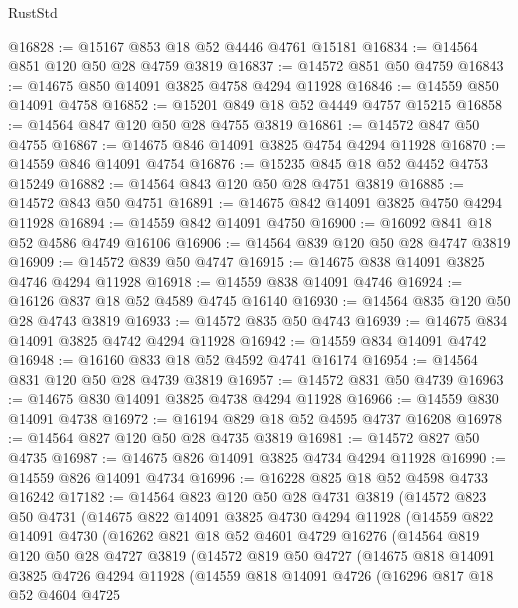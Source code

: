 \begin{lexlean}{RustStd}
\begin{coremodule}
@16828 := @15167 @853 @18 @52 @4446 @4761 @15181
@16834 := @14564 @851 @120 @50 @28 @4759 @3819
@16837 := @14572 @851 @50 @4759
@16843 := @14675 @850 @14091 @3825 @4758 @4294 @11928
@16846 := @14559 @850 @14091 @4758
@16852 := @15201 @849 @18 @52 @4449 @4757 @15215
@16858 := @14564 @847 @120 @50 @28 @4755 @3819
@16861 := @14572 @847 @50 @4755
@16867 := @14675 @846 @14091 @3825 @4754 @4294 @11928
@16870 := @14559 @846 @14091 @4754
@16876 := @15235 @845 @18 @52 @4452 @4753 @15249
@16882 := @14564 @843 @120 @50 @28 @4751 @3819
@16885 := @14572 @843 @50 @4751
@16891 := @14675 @842 @14091 @3825 @4750 @4294 @11928
@16894 := @14559 @842 @14091 @4750
@16900 := @16092 @841 @18 @52 @4586 @4749 @16106
@16906 := @14564 @839 @120 @50 @28 @4747 @3819
@16909 := @14572 @839 @50 @4747
@16915 := @14675 @838 @14091 @3825 @4746 @4294 @11928
@16918 := @14559 @838 @14091 @4746
@16924 := @16126 @837 @18 @52 @4589 @4745 @16140
@16930 := @14564 @835 @120 @50 @28 @4743 @3819
@16933 := @14572 @835 @50 @4743
@16939 := @14675 @834 @14091 @3825 @4742 @4294 @11928
@16942 := @14559 @834 @14091 @4742
@16948 := @16160 @833 @18 @52 @4592 @4741 @16174
@16954 := @14564 @831 @120 @50 @28 @4739 @3819
@16957 := @14572 @831 @50 @4739
@16963 := @14675 @830 @14091 @3825 @4738 @4294 @11928
@16966 := @14559 @830 @14091 @4738
@16972 := @16194 @829 @18 @52 @4595 @4737 @16208
@16978 := @14564 @827 @120 @50 @28 @4735 @3819
@16981 := @14572 @827 @50 @4735
@16987 := @14675 @826 @14091 @3825 @4734 @4294 @11928
@16990 := @14559 @826 @14091 @4734
@16996 := @16228 @825 @18 @52 @4598 @4733 @16242
@17182 := @14564
    @823
    @120
    @50
    @28
    @4731
    @3819
    (@14572
      @823
      @50
      @4731
      (@14675
        @822
        @14091
        @3825
        @4730
        @4294
        @11928
        (@14559
          @822
          @14091
          @4730
          (@16262
            @821
            @18
            @52
            @4601
            @4729
            @16276
            (@14564
              @819
              @120
              @50
              @28
              @4727
              @3819
              (@14572
                @819
                @50
                @4727
                (@14675
                  @818
                  @14091
                  @3825
                  @4726
                  @4294
                  @11928
                  (@14559
                    @818
                    @14091
                    @4726
                    (@16296
                      @817
                      @18
                      @52
                      @4604
                      @4725

\end{coremodule}
\end{lexlean}
